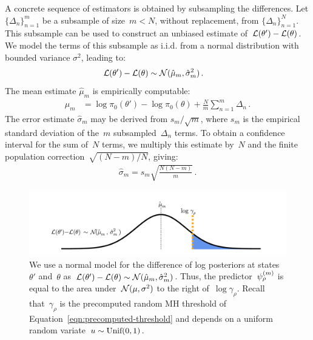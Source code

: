 \documentclass[angelino.tex]{subfiles}
\begin{document}
A concrete sequence of estimators is obtained by subsampling the differences.
%
Let $\{\Delta_n\}_{n=1}^{m}$ be a subsample of size~${m<N}$, without
replacement, from $\{\Delta_n\}_{n=1}^{N}$.  This subsample can be used to
construct an unbiased estimate of~${\mathcal{L}(\theta') - \mathcal{L}(\theta)}$.
%
We model the terms of this subsample as i.i.d. from a normal distribution with
bounded variance $\sigma^2$, leading to:
%
\begin{align}
  {\mathcal{L}(\theta') - \mathcal{L}(\theta)} &\sim {\mathcal N}(\hat{\mu}_m, \hat{\sigma}_m^2)\,.
\label{model-single}
\end{align}
%
The mean estimate $\hat\mu_m$ is empirically computable:
%
\begin{align}
  \hat{\mu}_m &= \log \pi_0(\theta') - \log\pi_0(\theta) + \frac{N}{m}\sum_{n=1}^m \Delta_n\,.
  \label{eqn:mu}
\end{align}
%
The error estimate $\hat\sigma_m$ may be derived from $s_m/\sqrt{m}$, where $s_m$ is the empirical standard deviation of the~$m$ subsampled~$\Delta_n$ terms. To obtain a confidence interval for the sum of~$N$ terms, we multiply this estimate by~$N$ and the finite population correction~$\sqrt{(N - m) / N}$, giving:
\begin{align}
\hat{\sigma}_m = s_m  \sqrt{\frac{N (N - m)}{m}}\,.
\label{eqn:sigma}
\end{align}
%
\begin{figure}[t!]
\vspace{-0.2in}
\begin{center}
\includegraphics[width=\textwidth]{figs/accept.pdf}
\end{center}
\vspace{-0.2in}
\caption{We use a normal model for the difference of log posteriors at states~$\theta'$ 
and~$\theta$ as~${\mathcal{L}(\theta') - \mathcal{L}(\theta)} \sim {\mathcal N}(\hat{\mu}_m, \hat{\sigma}_m^2)$.
Thus, the predictor~$\psi_{\rho}^{(m)}$ is equal to the area under~${\mathcal N}(\mu, \sigma^2)$
to the right of~$\log \gamma_\rho$.
Recall that~$\gamma_\rho$ is the precomputed random MH threshold of
Equation~\ref{eqn:precomputed-threshold} and depends on a
uniform random variate~${u \sim \mbox{Unif}(0, 1)}$.
}
\label{fig:accept}
\end{figure}
\end{document}
